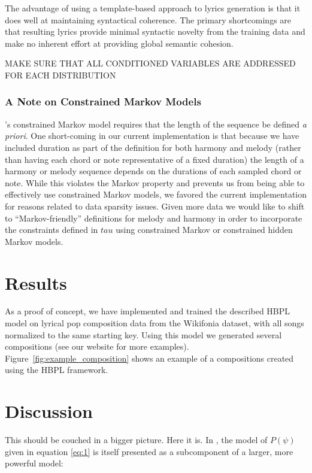 \documentclass[letterpaper]{article}
\begin{document}
The advantage of using a template-based approach to lyrics generation is that it does well at maintaining syntactical coherence. The primary shortcomings are that resulting lyrics provide minimal syntactic novelty from the training data and make no inherent effort at providing global semantic cohesion.
  
MAKE SURE THAT ALL CONDITIONED VARIABLES ARE ADDRESSED FOR EACH DISTRIBUTION

\subsubsection{A Note on Constrained Markov Models}

\cite{pachet2001finite}'s constrained Markov model requires that the length of the sequence be defined \emph{a priori}. One short-coming in our current implementation is that because we have included duration as part of the definition for both harmony and melody (rather than having each chord or note representative of a fixed duration) the length of a harmony or melody sequence depends on the durations of each sampled chord or note. While this violates the Markov property and prevents us from being able to effectively use constrained Markov models, we favored the current implementation for reasons related to data sparsity issues. Given more data we would like to shift to ``Markov-friendly'' definitions for melody and harmony in order to incorporate the constraints defined in $tau$ using constrained Markov or constrained hidden Markov models.

\section{Results}

As a proof of concept, we have implemented and trained the described HBPL model on lyrical pop composition data from the Wikifonia dataset, with all songs normalized to the same starting key. Using this model we generated several compositions (see our website for more examples). Figure~\ref{fig:example_composition} shows an example of a compositions created using the HBPL framework.

\section{Discussion}

This should be couched in a bigger picture. Here it is. In \cite{lake2014thesis}, the model of $P(\psi)$ given in equation \ref{eq:1} is itself presented as a subcomponent of a larger, more powerful model:
\end{document}
